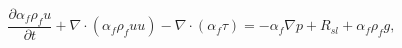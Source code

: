\begin{equation}
\frac{\partial \alpha_f \rho_f u}{\partial t}   +
\nabla \cdot (\alpha_f \rho_f u u) - \nabla \cdot (\alpha_f \tau)  = 
 - \alpha_f \nabla p + R_{sl} + \alpha_f \rho_f g ,
 \label{eq:nsmomentumequation3}
\end{equation}
